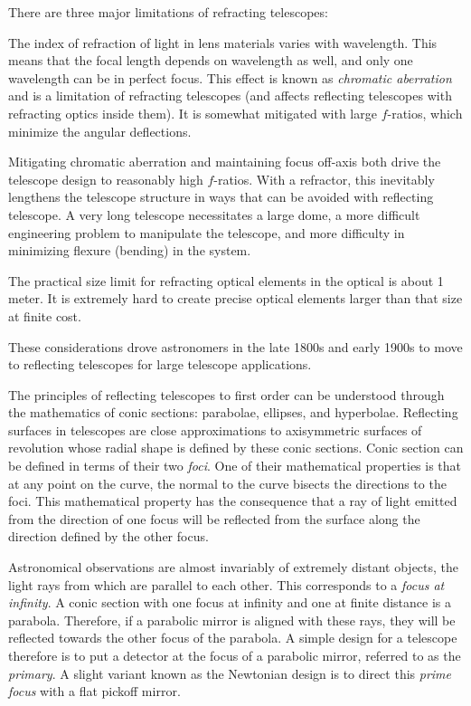 There are three major limitations of refracting telescopes:
\begin{ditemize}
\item The index of refraction of light in lens materials varies with
wavelength. This means that the focal length depends on wavelength as
well, and only one wavelength can be in perfect focus. This effect is
known as {\it chromatic aberration} and is a limitation of refracting
telescopes (and affects reflecting telescopes with refracting optics
inside them). It is somewhat mitigated with large $f$-ratios, which
minimize the angular deflections.
\item Mitigating chromatic aberration and maintaining focus off-axis
both drive the telescope design to reasonably high $f$-ratios. With a
refractor, this inevitably lengthens the telescope structure in ways
that can be avoided with reflecting telescope. A very long telescope
necessitates a large dome, a more difficult engineering problem to
manipulate the telescope, and more difficulty in minimizing flexure
(bending) in the system.
\item
The practical size limit for refracting optical elements in the
optical is about 1 meter. It is extremely hard to create precise
optical elements larger than that size at finite cost.
\end{ditemize}
These considerations drove astronomers in the late 1800s and early
1900s to move to reflecting telescopes for large telescope
applications.

The principles of reflecting telescopes to first order can be
understood through the mathematics of conic sections: parabolae,
ellipses, and hyperbolae. Reflecting surfaces in telescopes are close
approximations to axisymmetric surfaces of revolution whose radial
shape is defined by these conic sections. Conic section can be defined
in terms of their two {\it foci}. One of their mathematical properties
is that at any point on the curve, the normal to the curve bisects the
directions to the foci. This mathematical property has the consequence
that a ray of light emitted from the direction of one focus will be
reflected from the surface along the direction defined by the other
focus.

Astronomical observations are almost invariably of extremely distant
objects, the light rays from which are parallel to each other. This
corresponds to a {\it focus at infinity}. A conic section with one
focus at infinity and one at finite distance is a parabola. Therefore,
if a parabolic mirror is aligned with these rays, they will be
reflected towards the other focus of the parabola. A simple design for
a telescope therefore is to put a detector at the focus of a parabolic
mirror, referred to as the {\it primary}. A slight variant known as
the Newtonian design is to direct this {\it prime focus} with a flat
pickoff mirror.

